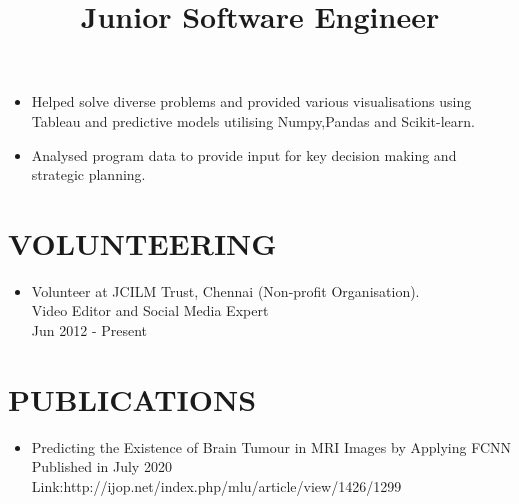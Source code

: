 \documentclass[margin]{res}
\begin{document}
\begin{resume}
\begin{position}
\begin{itemize}
\end{itemize}
\end{position}
\title{\textbf{Junior Software Engineer}}
\begin{position}
\baselineskip=0pt
\begin{itemize}
\item Helped solve diverse problems and provided various visualisations using Tableau and predictive models utilising Numpy,Pandas and Scikit-learn.
\item Analysed program data to provide input for key decision making and strategic planning.
\end{itemize}
\end{position}
\section{VOLUNTEERING}
\begin{itemize}
\item Volunteer at JCILM Trust, Chennai (Non-profit Organisation). \\ Video Editor and Social Media Expert\\ Jun 2012 - Present
\end{itemize}
\section{PUBLICATIONS}
\begin{itemize}
\item Predicting the Existence of Brain Tumour in MRI Images by Applying FCNN \\ Published in July 2020 \\Link:http://ijop.net/index.php/mlu/article/view/1426/1299 
\end{itemize}

\end{resume}
\end{document}
